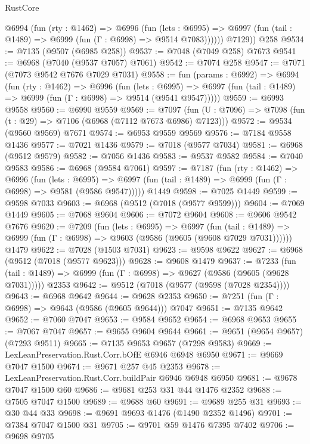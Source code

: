 \begin{lexlean}{RustCore}
\begin{coremodule}
          @6994
            (fun (rty : @1462) =>
            @6996
              (fun (lets : @6995) =>
              @6997 (fun (tail : @1489) => @6999 (fun (Γ : @6998) => @9514 @7083))))))
        @7129))
    @258
@9534 := @7135 (@9507 (@6985 @258))
@9537 := @7048 (@7049 @258) @7673
@9541 := @6968 (@7040 (@9537 @7057) @7061)
@9542 := @7074 @258
@9547 := @7071 (@7073 @9542 @7676 @7029 @7031)
@9558 := fun (params : @6992) =>
  @6994
    (fun (rty : @1462) =>
    @6996
      (fun (lets : @6995) =>
      @6997 (fun (tail : @1489) => @6999 (fun (Γ : @6998) => @9514 (@9541 @9547)))))
@9559 := @6993 @9558
@9560 := @6990 @9559
@9569 := @7097 (fun (U : @7096) => @7098 (fun (t : @29) => @7106 (@6968 (@7112 @7673 @6986) @7123)))
@9572 := @9534 (@9560 @9569) @7671
@9574 := @6953 @9559 @9569
@9576 := @7184 @9558 @1436
@9577 := @7021 @1436
@9579 := @7018 (@9577 @7034)
@9581 := @6968 (@9512 @9579)
@9582 := @7056 @1436
@9583 := @9537 @9582
@9584 := @7040 @9583
@9586 := @6968 (@9584 @7061)
@9597 := @7187
    (fun (rty : @1462) =>
    @6996
      (fun (lets : @6995) =>
      @6997 (fun (tail : @1489) => @6999 (fun (Γ : @6998) => @9581 (@9586 @9547)))))
    @1449
@9598 := @7025 @1449
@9599 := @9598 @7033
@9603 := @6968 (@9512 (@7018 (@9577 @9599)))
@9604 := @7069 @1449
@9605 := @7068 @9604
@9606 := @7072 @9604
@9608 := @9606 @9542 @7676
@9620 := @7209
    (fun (lets : @6995) =>
    @6997
      (fun (tail : @1489) => @6999 (fun (Γ : @6998) => @9603 (@9586 (@9605 (@9608 @7029 @7031))))))
    @1479
@9622 := @7028 (@1503 @7031)
@9623 := @9598 @9622
@9627 := @6968 (@9512 (@7018 (@9577 @9623)))
@9628 := @9608 @1479
@9637 := @7233
    (fun (tail : @1489) => @6999 (fun (Γ : @6998) => @9627 (@9586 (@9605 (@9628 @7031)))))
    @2353
@9642 := @9512 (@7018 (@9577 (@9598 (@7028 @2354))))
@9643 := @6968 @9642
@9644 := @9628 @2353
@9650 := @7251 (fun (Γ : @6998) => @9643 (@9586 (@9605 @9644))) @7047
@9651 := @7135 @9642
@9652 := @7060 @7047
@9653 := @9584 @9652
@9654 := @6968 @9653
@9655 := @7067 @7047
@9657 := @9655 @9604 @9644
@9661 := @9651 (@9654 @9657) (@7293 @9511)
@9665 := @7135 @9653 @9657 (@7298 @9583)
@9669 := LexLeanPreservation.Rust.Corr.bOfE @6946 @6948 @6950
@9671 := @9669 @7047 @1500
@9674 := @9671 @257 @45 @2353
@9678 := LexLeanPreservation.Rust.Corr.buildPair @6946 @6948 @6950
@9681 := @9678 @7047 @1500 @60
@9686 := @9681 @253 @31 @44 @1476 @2352
@9688 := @7505 @7047 @1500
@9689 := @9688 @60
@9691 := @9689 @255 @31
@9693 := @30 @44 @33
@9698 := @9691 @9693 @1476 (@1490 @2352 @1496)
@9701 := @7384 @7047 @1500 @31
@9705 := @9701 @59 @1476 @7395 @7402
@9706 := @9698 @9705

\end{coremodule}
\end{lexlean}
